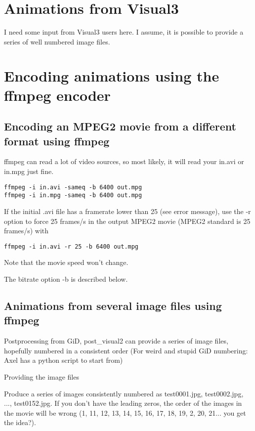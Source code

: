 \section{Animations from Visual3}

 I need some input from Visual3 users here. I assume, it is possible
 to provide a series of well numbered image files.

\section{Encoding animations using the ffmpeg encoder}

\subsection{Encoding an MPEG2 movie from a different format using ffmpeg}

 ffmpeg can read a lot of video sources, so most likely, it will read
 your in.avi or in.mpg just fine.

\begin{verbatim}
ffmpeg -i in.avi -sameq -b 6400 out.mpg
ffmpeg -i in.mpg -sameq -b 6400 out.mpg
\end{verbatim}

 If the initial .avi file has a framerate lower than 25 (see error message), use the -r option to force 25 frames/s in the output MPEG2 movie (MPEG2 standard is 25 frames/s) with

\begin{verbatim}
ffmpeg -i in.avi -r 25 -b 6400 out.mpg
\end{verbatim}

 Note that the movie speed won't change. 

 The bitrate option -b is described below.

\subsection{Animations from several image files using ffmpeg}

 Postprocessing from GiD, post\_visual2 can provide a series of image
 files, hopefully numbered in a consistent order (For weird and stupid
 GiD numbering: Axel has a python script to start from)

Providing the image files

 Produce a series of images consistently numbered as test0001.jpg,
test0002.jpg, ..., test0152.jpg. If you don't have the leading zeros,
the order of the images in the movie will be wrong (1, 11, 12, 13, 14,
15, 16, 17, 18, 19, 2, 20, 21... you get the idea?). 

